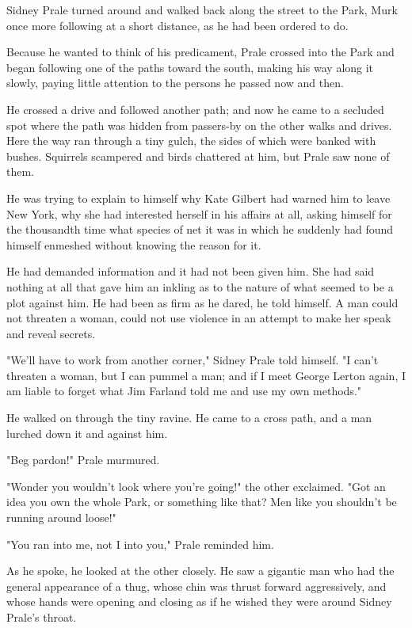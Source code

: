 \documentclass{novel}
\begin{document}
Sidney Prale turned around and walked back along the street to the Park, Murk once more following at a short distance, as he had been ordered to do.

Because he wanted to think of his predicament, Prale crossed into the Park and began following one of the paths toward the south, making his way along it slowly, paying little attention to the persons he passed now and then.

He crossed a drive and followed another path; and now he came to a secluded spot where the path was hidden from passers-by on the other walks and drives. Here the way ran through a tiny gulch, the sides of which were banked with bushes. Squirrels scampered and birds chattered at him, but Prale saw none of them.

He was trying to explain to himself why Kate Gilbert had warned him to leave New York, why she had interested herself in his affairs at all, asking himself for the thousandth time what species of net it was in which he suddenly had found himself enmeshed without knowing the reason for it.

He had demanded information and it had not been given him. She had said nothing at all that gave him an inkling as to the nature of what seemed to be a plot against him. He had been as firm as he dared, he told himself. A man could not threaten a woman, could not use violence in an attempt to make her speak and reveal secrets.

"We'll have to work from another corner," Sidney Prale told himself. "I can't threaten a woman, but I can pummel a man; and if I meet George Lerton again, I am liable to forget what Jim Farland told me and use my own methods."

He walked on through the tiny ravine. He came to a cross path, and a man lurched down it and against him.

"Beg pardon!" Prale murmured.

"Wonder you wouldn't look where you're going!" the other exclaimed. "Got an idea you own the whole Park, or something like that? Men like you shouldn't be running around loose!"

"You ran into me, not I into you," Prale reminded him.

As he spoke, he looked at the other closely. He saw a gigantic man who had the general appearance of a thug, whose chin was thrust forward aggressively, and whose hands were opening and closing as if he wished they were around Sidney Prale's throat.
\end{document}
